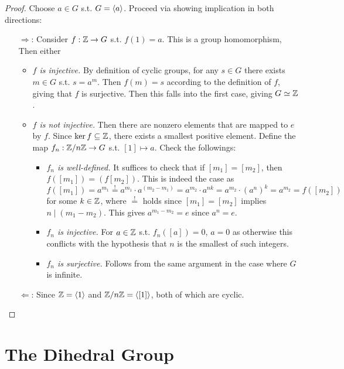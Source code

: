 \begin{proof}
    Choose $a \in G$ s.t. $G = \left\langle a \right\rangle$. Proceed via showing implication in both directions:
    \begin{enumerate}
        \item[$\Rightarrow$:] Consider $f: \mathbb{Z} \to G$ s.t. $f(1) = a$. This is a group homomorphism,  Then either
        \begin{itemize}
            \item \emph{$f$ is injective.} By definition of cyclic groups, for any $s \in G$ there exists $m \in G$ s.t. $s = a^m$. Then $f(m) = s$ according to the definition of $f$, giving that $f$ is surjective. Then this falls into the first case, giving $G \simeq \mathbb{Z}$.
            \item \emph{$f$ is not injective.} Then there are nonzero elements that are mapped to $e$ by $f$. Since $\ker f \subseteq \mathbb{Z}$, there exists a smallest positive element. Define the map $f_n: \mathbb{Z}/n\mathbb{Z} \to G$ s.t. $[1] \mapsto a$. Check the followings:
            \begin{itemize}
                \item \emph{$f_n$ is well-defined.} It suffices to check that if $[m_1] = [m_2]$, then $f([m_1]) = (f[m_2])$. This is indeed the case as
                \[
                    f([m_1]) = a^{m_1} \overset{!}{=} a^{m_1} \cdot a^{(m_2 - m_1)} = a^{m_2} \cdot a^{nk} = a^{m_2} \cdot (a^n)^k = a^{m_2} = f([m_2])
                \]
                for some $k \in \mathbb{Z}$, where $\overset{!}{=}$ holds since $[m_1] = [m_2]$ implies $n \mid (m_1 - m_2)$. This gives $a^{m_1 - m_2} = e$ since $a^n = e$. 
                \item \emph{$f_n$ is injective.} For $a \in \mathbb{Z}$ s.t. $f_n([a]) = 0$, $a = 0$ as otherwise this conflicts with the hypothesis that $n$ is the smallest of such integers. 
                \item \emph{$f_n$ is surjective.} Follows from the same argument in the case where $G$ is infinite.
            \end{itemize}
        \end{itemize}
        \item[$\Leftarrow$:] Since $\mathbb{Z} = \left\langle 1 \right\rangle$ and $\mathbb{Z}/n\mathbb{Z} = \left\langle [1] \right\rangle$, both of which are cyclic. 
    \end{enumerate}
\end{proof}

\section{The Dihedral Group}

